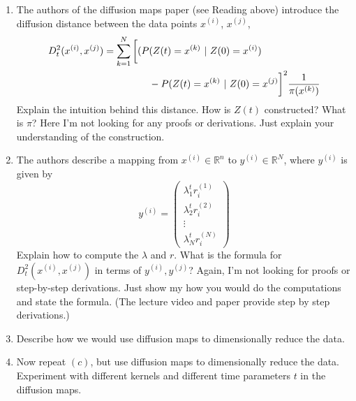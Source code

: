 \documentclass{article}
\begin{document}
\begin{enumerate}
\begin{enumerate}
\begin{enumerate}
\item The authors of the diffusion maps paper (see Reading above) introduce the diffusion distance between the data points $x^{(i)}$, $x^{(j)}$,
\begin{align}
D_t^2(x^{(i)},x^{(j)}) = \sum_{k=1}^N \bigg[ (P &(Z(t) = x^{(k)} \ |  \ Z(0) = x^{(i)}) 
\\ \notag &
- P(Z(t) = x^{(k)} \ | \ Z(0) = x^{(j)} \bigg]^2 \frac{1}{\pi(x^{(k)})} 
\end{align}
Explain the intuition behind this distance.  How is $Z(t)$ constructed?  What is $\pi$?   Here I'm not looking for any proofs or derivations.  Just explain your understanding of the construction.
\item The authors describe a mapping from $x^{(i)} \in \mathbb{R}^n$ to $y^{(i)} \in \mathbb{R}^N$, where $y^{(i)}$ is given by 
\begin{equation}
y^{(i)} = \left(
\begin{array}{c}
\lambda_1^t r^{(1)}_i \\
\lambda_2^t r^{(2)}_i \\
\vdots \\
\lambda_N^t r^{(N)}_i
\end{array}
\right)
\end{equation}
Explain how to compute the $\lambda$ and $r$.
What is the formula for $D_t^2(x^{(i)}, x^{(j)})$ in terms of $y^{(i)}, y^{(j)}$?   Again, I'm not looking for proofs or step-by-step derivations.  Just show my how you would do the computations and state the formula.  (The lecture video  and paper provide step by step derivations.)
\item Describe how we would use diffusion maps to dimensionally reduce the data.
\item Now repeat $(c)$, but use diffusion maps to dimensionally reduce the data.  Experiment with different kernels and different time parameters $t$ in the diffusion maps.  

\end{enumerate}
\end{enumerate}






\end{enumerate}
\end{document}
